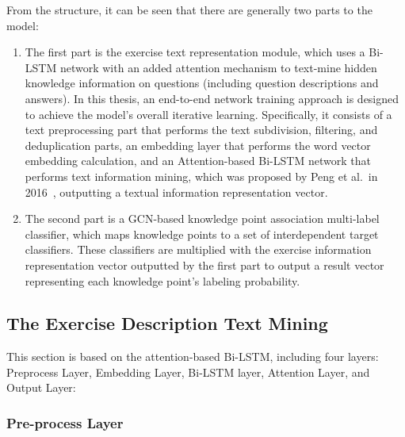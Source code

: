 From the structure, it can be seen that there are generally two parts to the model:
\begin{enumerate}
    \item The first part is the exercise text representation module, which uses a Bi-LSTM network with an added attention mechanism to text-mine hidden knowledge information on questions (including question descriptions and answers). In this thesis, an end-to-end network training approach is designed to achieve the model's overall iterative learning. Specifically, it consists of a text preprocessing part that performs the text subdivision, filtering, and deduplication parts, an embedding layer that performs the word vector embedding calculation, and an Attention-based Bi-LSTM network that performs text information mining, which was proposed by Peng et al.\ in 2016~\cite{zhou2016attention}, outputting a textual information representation vector.
    \item The second part is a GCN-based knowledge point association multi-label classifier, which maps knowledge points to a set of interdependent target classifiers. These classifiers are multiplied with the exercise information representation vector outputted by the first part to output a result vector representing each knowledge point's labeling probability.
\end{enumerate}


\subsection{The Exercise Description Text Mining}
This section is based on the attention-based Bi-LSTM, including four layers: Preprocess Layer, Embedding Layer, Bi-LSTM layer, Attention Layer, and Output Layer:
\subsubsection{Pre-process Layer}



